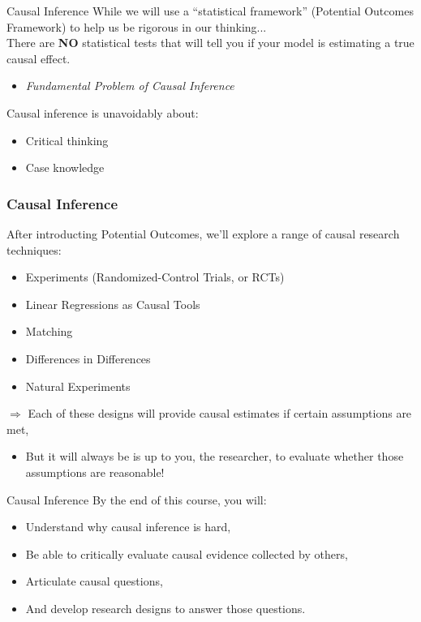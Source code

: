 \documentclass[11pt]{beamer}
\begin{document}
\begin{frame}[c]{Causal Inference}
While we will use a ``statistical framework'' (Potential Outcomes Framework) to help us be rigorous in our thinking... \\
\vspace*{0.2cm}
\pause There are \textbf{NO} statistical tests that will tell you if your model is estimating a true causal effect. \\
\begin{itemize}
  \pause \item \emph{Fundamental Problem of Causal Inference}
\end{itemize}
\vspace*{0.2cm}
\pause Causal inference is \alert{unavoidably} about: 
\begin{itemize}
  \item Critical thinking
  \item Case knowledge
\end{itemize}
\end{frame}

\begin{frame}[c]\frametitle{Causal Inference}
After introducting Potential Outcomes, we'll explore a range of causal research techniques:
\begin{itemize}
  \pause \item Experiments (Randomized-Control Trials, or RCTs)
  \pause \item Linear Regressions as Causal Tools 
  \pause \item Matching 
  \pause \item Differences in Differences
  \pause \item Natural Experiments
\end{itemize}
\pause $\Rightarrow$ Each of these designs will provide causal estimates \alert{if certain assumptions are met}, 
\begin{itemize}
  \pause \item But it will always be is up to you, the researcher, to evaluate whether those assumptions are reasonable!
\end{itemize}
\end{frame}

\begin{frame}[c]{Causal Inference}
  By the end of this course, you will:
  \begin{itemize}
      \item Understand why causal inference is hard, \\
      \pause \item Be able to critically evaluate causal evidence collected by others, \\
      \pause \item Articulate causal questions, \\
      \pause \item And develop research designs to answer those questions. 
  \end{itemize}
  \end{frame}
  
\end{document}
